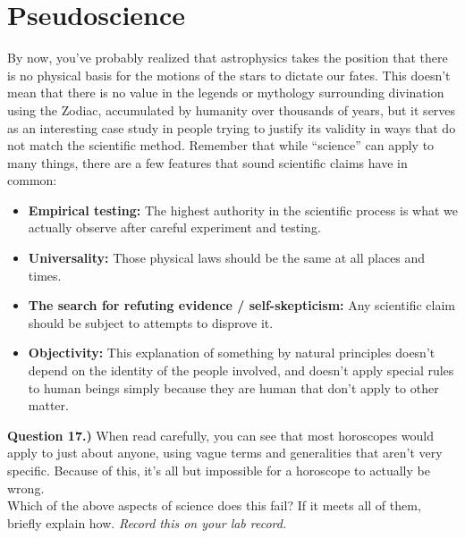 \documentclass[11pt]{article}
\begin{document}
\section{Pseudoscience}
By now, you've probably realized that astrophysics takes the position that there is no physical basis for the motions of the stars to dictate our fates. This doesn't mean that there is no value in the legends or mythology surrounding divination using the Zodiac, accumulated by humanity over thousands of years, but it serves as an interesting case study in people trying to justify its validity in ways that do not match the scientific method. Remember that while ``science'' can apply to many things, there are a few features that sound scientific claims have in common:
\begin{itemize}
	
	\item \textbf{Empirical testing:} The highest authority in the scientific process is what we actually observe after careful experiment and testing.\\
	\item \textbf{Universality:} Those physical laws should be the same at all places and times.\\
	\item \textbf{The search for refuting evidence / self-skepticism:} Any scientific claim should be subject to attempts to disprove it.\\
	\item \textbf{Objectivity:} This explanation of something by natural principles doesn't depend on the identity of the people involved, and doesn't apply special rules to human beings simply because they are human that don't apply to other matter.
\end{itemize}

\textbf{Question 17.)} When read carefully, you can see that most horoscopes would apply to just about anyone, using vague terms and generalities that aren't very specific. Because of this, it's all but impossible for a horoscope to actually be wrong.\\

Which of the above aspects of science does this fail? If it meets all of them, briefly explain how. {\it Record this on your lab record.}\\


\end{document}
